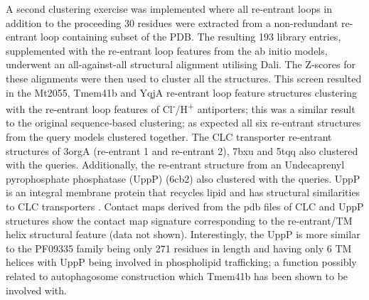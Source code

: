  A second clustering exercise was implemented where all re-entrant loops in addition to the proceeding 30 residues were extracted from a non-redundant re-entrant loop containing subset of the PDB. The resulting 193 library entries, supplemented with the re-entrant loop features from the ab initio models, underwent an all-against-all structural alignment utilising Dali. The Z-scores for these alignments were then used to cluster all the structures.  This screen resulted in the Mt2055, Tmem41b and YqjA re-entrant loop feature structures clustering with the re-entrant loop features of Cl\textsuperscript{-}/H\textsuperscript{+} antiporters; this was a similar result to the original sequence-based clustering; as expected all six re-entrant structures from the query models clustered together. The CLC transporter re-entrant structures of 3orgA (re-entrant 1 and re-entrant 2), 7bxu and 5tqq also clustered with the queries. Additionally, the re-entrant structure from an Undecaprenyl pyrophosphate phosphatase (UppP) (6cb2) also clustered with the queries. UppP is an integral membrane protein that recycles lipid and has structural similarities to CLC transporters \cite{Workman2018}. Contact maps derived from the pdb files of CLC and UppP structures show the contact map signature corresponding to the re-entrant/TM helix structural feature (data not shown). Interestingly, the UppP is more similar to the PF09335 family being only 271 residues in length and having only 6 TM helices with UppP being involved in phospholipid trafficking; a function possibly related to autophagosome construction which Tmem41b has been shown to be involved with. 
